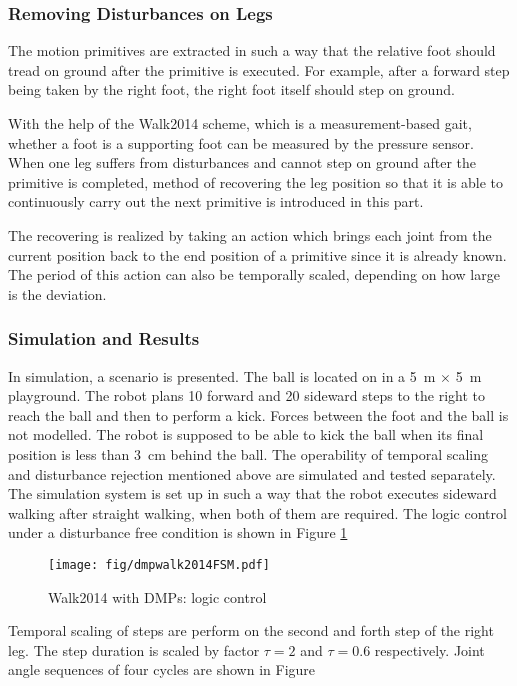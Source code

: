 \subsubsection{Removing Disturbances on Legs}
The motion primitives are extracted in such a way that the relative foot should tread on ground after the primitive is executed. For example, after a forward step being taken by the right foot, the right foot itself should step on ground. 

With the help of the Walk2014 scheme, which is a measurement-based gait, whether a foot is a supporting foot can be measured by the pressure sensor. When one leg suffers from disturbances and cannot step on ground after the primitive is completed, method of recovering the leg position so that it is able to continuously carry out the next primitive is introduced in this part.

The recovering is realized by taking an action which brings each joint from the current position back to the end position of a primitive since it is already known. The period of this action can also be temporally scaled, depending on how large is the deviation.

\subsubsection{Simulation and Results}
In simulation, a scenario is presented. The ball is located on in a \SI{5}{\meter} $ \times $ \SI{5}{\meter} playground. The robot plans 10 forward and 20 sideward steps to the right to reach the ball and then to perform a kick. Forces between the foot and the ball is not modelled. The robot is supposed to be able to kick the ball when its final position is less than \SI{3}{\cm} behind the ball. The operability of temporal scaling and disturbance rejection mentioned above are simulated and tested separately. The simulation system is set up in such a way that the robot executes sideward walking after straight walking, when both of them are required. The logic control under a disturbance free condition is shown in Figure {\ref{dmpwalk2014FSM}}

\begin{figure}[H]
	\centering
	\texttt{[image: fig/dmpwalk2014FSM.pdf]}
	\caption{Walk2014 with DMPs: logic control}
	\label{dmpwalk2014FSM}
\end{figure}

Temporal scaling of steps are perform on the second and forth step of the right leg. The step duration is scaled by factor $ \tau = 2 $ and $ \tau = 0.6 $ respectively. Joint angle sequences of four cycles are shown in Figure 

